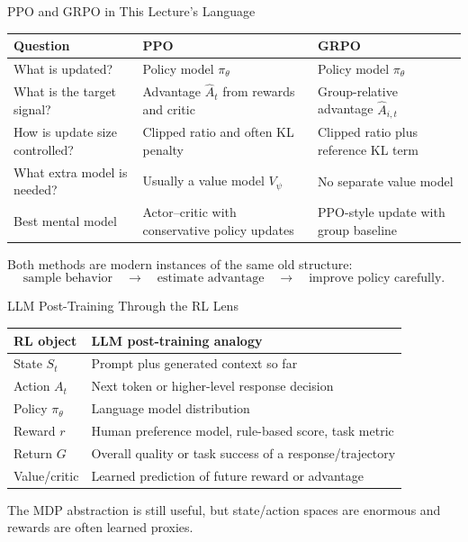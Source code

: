 \documentclass[aspectratio=169]{beamer}
\begin{document}
\begin{frame}{PPO and GRPO in This Lecture's Language}
\small
\begin{tabular}{>{\raggedright\arraybackslash}p{}
                >{\raggedright\arraybackslash}p{}
                >{\raggedright\arraybackslash}p{}}
\toprule
Question & PPO & GRPO \\
\midrule
What is updated? & Policy model $\pi_\theta$ & Policy model $\pi_\theta$ \\
What is the target signal? & Advantage $\widehat A_t$ from rewards and critic & Group-relative advantage $\widehat A_{i,t}$ \\
How is update size controlled? & Clipped ratio and often KL penalty & Clipped ratio plus reference KL term \\
What extra model is needed? & Usually a value model $V_\psi$ & No separate value model \\
Best mental model & Actor--critic with conservative policy updates & PPO-style update with group baseline \\
\bottomrule
\end{tabular}

\vspace{0.6em}
Both methods are modern instances of the same old structure:
\[
\text{sample behavior} \quad\rightarrow\quad \text{estimate advantage} \quad\rightarrow\quad \text{improve policy carefully}.
\]
\end{frame}

\begin{frame}{LLM Post-Training Through the RL Lens}
\small
\begin{tabular}{>{\raggedright\arraybackslash}p{}
                >{\raggedright\arraybackslash}p{}}
\toprule
RL object & LLM post-training analogy \\
\midrule
State $S_t$ & Prompt plus generated context so far \\
Action $A_t$ & Next token or higher-level response decision \\
Policy $\pi_\theta$ & Language model distribution \\
Reward $r$ & Human preference model, rule-based score, task metric \\
Return $G$ & Overall quality or task success of a response/trajectory \\
Value/critic & Learned prediction of future reward or advantage \\
\bottomrule
\end{tabular}

\vspace{0.8em}
The MDP abstraction is still useful, but state/action spaces are enormous and rewards are often learned proxies.
\end{frame}
\end{document}
